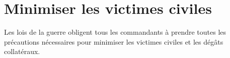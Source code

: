 \section{Minimiser les victimes civiles}
\begin{e1}
	\item Les lois de la guerre obligent tous les commandants à prendre toutes les précautions nécessaires pour minimiser les victimes civiles et les dégâts collatéraux.
\end{e1}